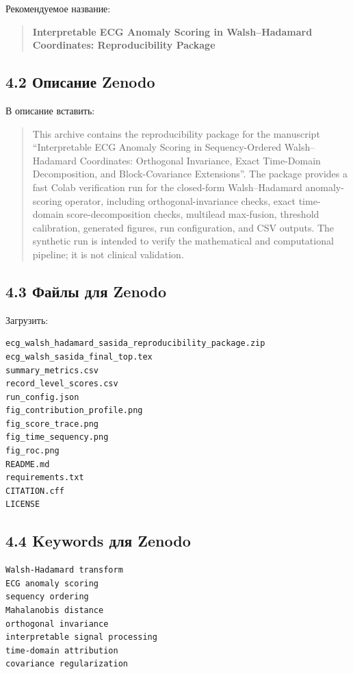 \documentclass[12pt,a4paper]{article}
\begin{document}
Рекомендуемое название:

\begin{quote}
\textbf{Interpretable ECG Anomaly Scoring in Walsh--Hadamard Coordinates: Reproducibility Package}
\end{quote}

\subsection*{4.2 Описание Zenodo}

В описание вставить:

\begin{quote}
This archive contains the reproducibility package for the manuscript ``Interpretable ECG Anomaly Scoring in Sequency-Ordered Walsh--Hadamard Coordinates: Orthogonal Invariance, Exact Time-Domain Decomposition, and Block-Covariance Extensions''. The package provides a fast Colab verification run for the closed-form Walsh--Hadamard anomaly-scoring operator, including orthogonal-invariance checks, exact time-domain score-decomposition checks, multilead max-fusion, threshold calibration, generated figures, run configuration, and CSV outputs. The synthetic run is intended to verify the mathematical and computational pipeline; it is not clinical validation.
\end{quote}

\subsection*{4.3 Файлы для Zenodo}

Загрузить:

\begin{verbatim}
ecg_walsh_hadamard_sasida_reproducibility_package.zip
ecg_walsh_sasida_final_top.tex
summary_metrics.csv
record_level_scores.csv
run_config.json
fig_contribution_profile.png
fig_score_trace.png
fig_time_sequency.png
fig_roc.png
README.md
requirements.txt
CITATION.cff
LICENSE
\end{verbatim}

\subsection*{4.4 Keywords для Zenodo}

\begin{verbatim}
Walsh-Hadamard transform
ECG anomaly scoring
sequency ordering
Mahalanobis distance
orthogonal invariance
interpretable signal processing
time-domain attribution
covariance regularization
\end{verbatim}
\end{document}
